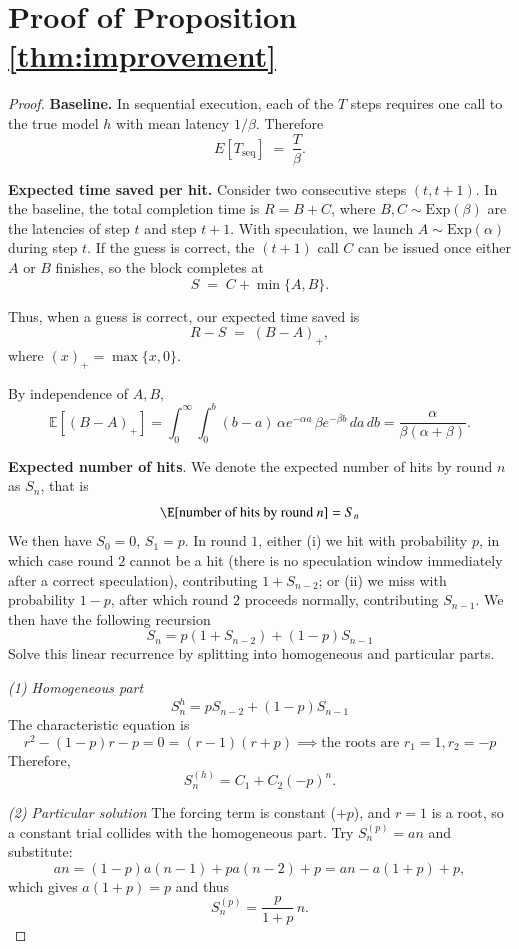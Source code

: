 \newpage
\section{Proof of Proposition \ref{thm:improvement}}
\label{app:proof}
\begin{proof}
\textbf{Baseline.}  
In sequential execution, each of the $T$ steps requires one call to the true model $h$ with mean latency $1/\beta$. Therefore
\[
E[T_{\mathrm{seq}}] \;=\; \frac{T}{\beta}.
\]

\medskip
\textbf{Expected time saved per hit.}  
Consider two consecutive steps $(t,t{+}1)$. In the baseline, the total completion time is $R = B + C$, where $B,C \sim \mathrm{Exp}(\beta)$ are the latencies of step $t$ and step $t{+}1$. With speculation, we launch $A \sim \mathrm{Exp}(\alpha)$ during step $t$. If the guess is correct, the $(t{+}1)$ call $C$ can be issued once either $A$ or $B$ finishes, so the block completes at
\[
S \;=\; C + \min\{A,B\}.
\]

Thus, when a guess is correct, our expected time saved is
\[
R - S \;=\; (B-A)_+,
\]
where $(x)_+ = \max\{x,0\}$.
  
By independence of $A,B$,
\[
\mathbb{E}[(B-A)_+]
= \int_{0}^{\infty}\!\int_{0}^{b} (b-a)\,\alpha e^{-\alpha a}\,\beta e^{-\beta b}\,da\,db
= \frac{\alpha}{\beta(\alpha+\beta)}.
\]

\medskip
\textbf{Expected number of hits}. We denote the expected number of hits by round $n$ as $S_n$, that is
$$\E[\text{number of hits by round }n] = S_n$$
We then have $S_0=0$, $S_1 = p$. In round $1$, either (i) we hit with probability $p$, in which case round $2$ cannot be a hit (there is no speculation window immediately after a correct speculation), contributing $1+S_{n-2}$; or (ii) we miss with probability $1-p$, after which round $2$ proceeds normally, contributing $S_{n-1}$. We then have the following recursion
$$S_n = p(1+S_{n-2}) + (1-p)S_{n-1}$$
Solve this linear recurrence by splitting into homogeneous and particular parts.

\textit{(1) Homogeneous part}
\[S_n^{h} = pS_{n-2}+ (1-p)S_{n-1}\]
The characteristic equation is
\[
r^2-(1-p)r-p=0=(r-1)(r+p) \implies \text{the roots are }r_1=1, r_2=-p
\]
Therefore,
\[
S_n^{(h)}=C_1 + C_2(-p)^n.
\]

\textit{(2) Particular solution}
The forcing term is constant ($+p$), and $r=1$ is a root, so a constant trial collides with the homogeneous part. Try $S_n^{(p)}=an$ and substitute:
\[
an=(1-p)a(n-1)+pa(n-2)+p
= an - a(1+p) + p,
\]
which gives $a(1+p)=p$ and thus
\[
S_n^{(p)}=\frac{p}{1+p}\,n.
\]


\end{proof}
